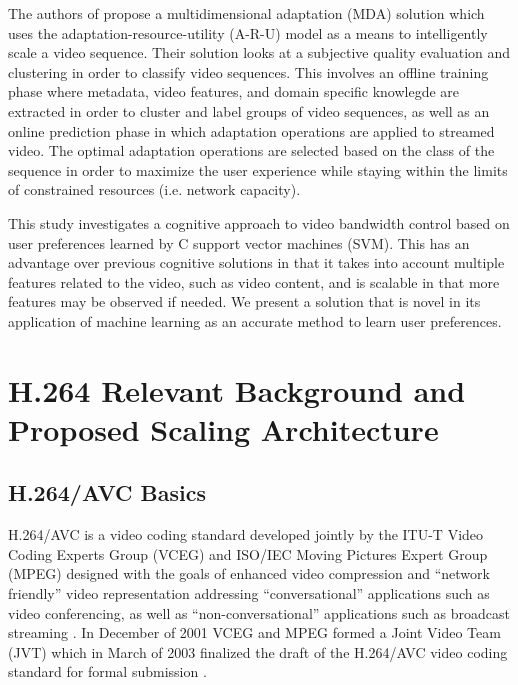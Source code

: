 The authors of \cite{wang2005classification} propose a multidimensional adaptation (MDA) solution which uses the adaptation-resource-utility (A-R-U) model as a means to intelligently scale a video sequence. Their solution looks at a subjective quality evaluation and clustering in order to classify video sequences. This involves an offline training phase where metadata, video features, and domain specific knowlegde are extracted in order to cluster and label groups of video sequences, as well as an online prediction phase in which adaptation operations are applied to streamed video. The optimal adaptation operations are selected based on the class of the sequence in order to maximize the user experience while staying within the limits of constrained resources (i.e. network capacity). 

This study investigates a cognitive approach to video bandwidth control based on user preferences learned by C support vector machines (SVM). This has an advantage over previous cognitive solutions in that it takes into account multiple features related to the video, such as video content, and is scalable in that more features may be observed if needed. We present a solution that is novel in its application of machine learning as an accurate method to learn user preferences.


\section{H.264 Relevant Background and Proposed Scaling Architecture}
\label{sec:H.264}

\subsection{H.264/AVC Basics}

H.264/AVC is a video coding standard developed jointly by the ITU-T Video Coding Experts Group (VCEG) and ISO/IEC Moving Pictures Expert Group (MPEG) designed with the goals of enhanced video compression and ``network friendly'' video representation addressing ``conversational'' applications such as video conferencing, as well as ``non-conversational'' applications such as broadcast streaming \cite{H264AVCOverview}. In December of 2001 VCEG and MPEG formed a Joint Video Team (JVT) which in March of 2003 finalized the draft of the H.264/AVC video coding standard for formal submission \cite{H264AVCOverview}. 


